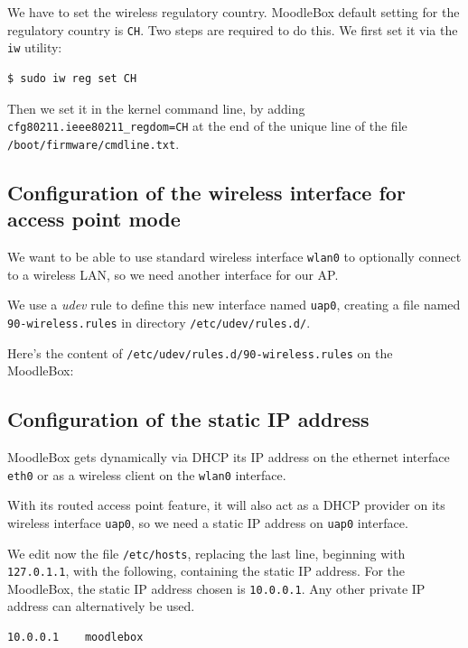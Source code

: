 \documentclass[12pt]{article}
\begin{document}
We have to set the wireless regulatory country.
MoodleBox default setting for the regulatory country is \lstinline{CH}.
Two steps are required to do this.
We first set it via the \lstinline{iw} utility:
\begin{lstlisting}[language=bash]
$ sudo iw reg set CH
\end{lstlisting}
Then we set it in the kernel command line, by adding \lstinline{cfg80211.ieee80211_regdom=CH} at the end of the unique line of the file \lstinline{/boot/firmware/cmdline.txt}.

\subsection{Configuration of the wireless interface for access point mode}

We want to be able to use standard wireless interface \lstinline{wlan0} to optionally connect to a wireless LAN, so we need another interface for our AP.

We use a \textsl{udev} rule to define this new interface named \lstinline{uap0}, creating a file named \lstinline{90-wireless.rules} in directory \lstinline{/etc/udev/rules.d/}.

Here's the content of \lstinline{/etc/udev/rules.d/90-wireless.rules} on the MoodleBox:


\subsection{Configuration of the static IP address}\label{ssec-static-ip}

MoodleBox gets dynamically via DHCP its IP address on the ethernet interface \lstinline{eth0} or as a wireless client on the \lstinline{wlan0} interface.

With its routed access point feature, it will also act as a DHCP provider on its wireless interface \lstinline{uap0}, so we need a static IP address on \lstinline{uap0} interface.

We edit now the file \lstinline{/etc/hosts}, replacing the last line, beginning with \lstinline{127.0.1.1}, with the following, containing the static IP address.
For the MoodleBox, the static IP address chosen is \lstinline{10.0.0.1}.
Any other private IP address can alternatively be used.
\begin{lstlisting}[language=bash]
10.0.0.1	moodlebox
\end{lstlisting}
\end{document}
